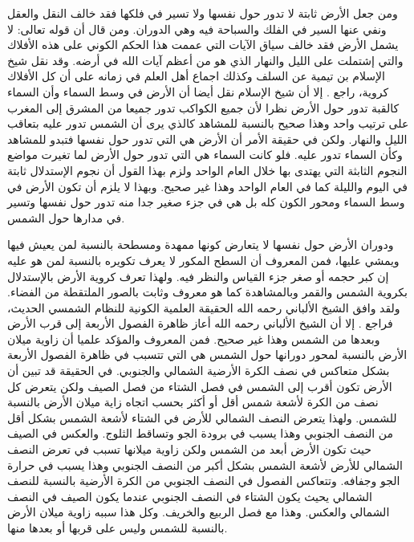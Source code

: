 ومن جعل الأرض ثابتة لا تدور حول نفسها ولا تسير في فلكها فقد خالف النقل والعقل ونفي عنها السير  في الفلك والسباحة فيه وهي الدوران. ومن قال أن قوله تعالى: \quranayah*[36][40]{\footnotesize (\surahname*[36])} لا يشمل الأرض فقد خالف سياق الآيات التي عممت هذا الحكم الكوني على هذه الأفلاك والتي إشتملت على الليل والنهار الذي هو من أعظم آيات الله في أرضه. وقد نقل شيخ الإسلام بن تيمية عن السلف وكذلك اجماع أهل العلم في زمانه على أن كل الأفلاك كروية، راجع . إلا أن شيخ الإسلام نقل أيضا أن الأرض في وسط السماء وأن السماء كالقبة تدور حول الأرض نظرا لأن جميع الكواكب تدور جميعا من المشرق إلى المغرب على ترتيب واحد وهذا صحيح بالنسبة للمشاهد كالذي يرى أن الشمس تدور عليه بتعاقب الليل والنهار. ولكن في حقيقة الأمر أن الأرض هي التي تدور حول نفسها فتبدو للمشاهد وكأن السماء تدور عليه. فلو كانت السماء هي التي تدور حول الأرض لما تغيرت مواضع النجوم الثابثة التي يهتدى بها خلال العام الواحد ولزم بهذا القول أن نجوم الإستدلال ثابتة في اليوم والليلة كما في العام الواحد وهذا غير صحيح. وبهذا لا يلزم أن تكون الأرض في وسط السماء ومحور الكون كله بل هي في جزء صغير جدا منه تدور حول نفسها وتسير في مدارها حول الشمس. 

ودوران الأرض حول نفسها لا يتعارض كونها ممهدة ومسطحة بالنسبة لمن يعيش فيها ويمشي عليها، فمن المعروف أن السطح المكور لا يعرف تكويره بالنسبة لمن هو عليه إن كبر حجمه أو صغر جزء القياس والنظر فيه. ولهذا تعرف كروية الأرض بالإستدلال بكروية الشمس والقمر وبالمشاهدة كما هو معروف وثابت بالصور الملتقطة من الفضاء. ولقد وافق الشيخ الألباني رحمه الله الحقيقة العلمية الكونية للنظام الشمسي الحديث، فراجع . إلا أن الشيخ الألباني رحمه الله أعاز ظاهرة الفصول الأربعة إلى قرب الأرض وبعدها من الشمس وهذا غير صحيح. فمن المعروف  والمؤكد علميا أن زاوية ميلان الأرض بالنسبة لمحور دورانها حول الشمس هي التي تتسبب في ظاهرة الفصول الأربعة بشكل متعاكس في نصف الكرة الأرضية الشمالي والجنوبي. في الحقيقة قد تبين أن الأرض تكون أقرب إلى الشمس في فصل الشتاء من فصل الصيف ولكن يتعرض كل نصف من الكرة لأشعة شمس أقل أو أكثر بحسب اتجاه زاية ميلان الأرض بالنسبة للشمس. ولهذا يتعرض النصف الشمالي للأرض في الشتاء لأشعة الشمس بشكل أقل من النصف الجنوبي وهذا يسبب في برودة الجو وتساقط الثلوج. والعكس في الصيف حيث تكون الأرض أبعد من الشمس ولكن زاوية ميلانها تسبب في تعرض النصف الشمالي للأرض لأشعة الشمس بشكل أكبر من النصف الجنوبي وهذا يسبب في حرارة الجو وجفافه. وتتعاكس الفصول في النصف الجنوبي من الكرة الأرضية بالنسبة للنصف الشمالي يحيث يكون الشتاء في النصف الجنوبي عندما يكون الصيف في النصف الشمالي والعكس. وهذا مع فصل الربيع والخريف. وكل هذا سببه زاوية ميلان الأرض بالنسبة للشمس وليس على قربها أو بعدها منها. 


